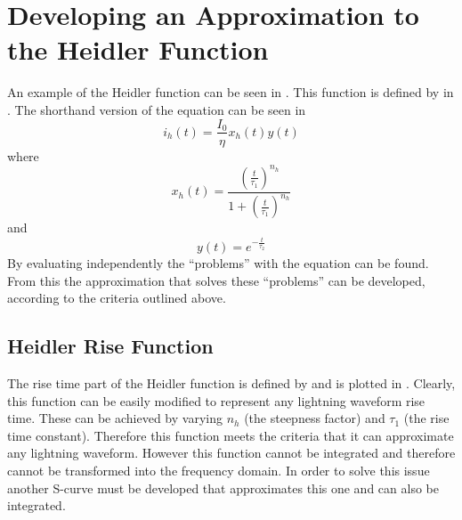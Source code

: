 \section{Developing an Approximation to the Heidler Function}
\label{sec:developing_approximation}
An example of the Heidler function can be seen in . This function is defined by  in .
The shorthand version of the equation can be seen in 
\begin{equation}
i_h \left( t \right) = \frac{I_0}{\eta} x_h \left( t \right) y \left( t \right)
\label{eqn:HFsmall}
\end{equation}
where
\begin{equation}
    x_h \left( t \right) = \frac{{\left (\frac{t}{\tau_1} \right )}^{n_h}}{1 + {\left (\frac{t}{\tau_1} \right )}^{n_h}}
    \label{eqn:HFrise}
\end{equation}
and
\begin{equation}
    y \left( t \right) = e^{-\frac{t}{\tau_2}}
    \label{eqn:HFfall}
\end{equation}
By evaluating  independently the ``problems'' with the equation can be found. From this the approximation that solves these ``problems'' can be developed, according to the criteria outlined above.

\subsection{Heidler Rise Function}
\label{sub:approx_heidler_rise_function}

The rise time part of the Heidler function is defined by  and is plotted in . Clearly, this function can be easily modified to represent any lightning waveform rise time. These can be achieved by varying $n_h$ (the steepness factor) and $\tau_1$ (the rise time constant). Therefore this function meets the criteria that it can approximate any lightning waveform. However this function cannot be integrated and therefore cannot be transformed into the frequency domain. In order to solve this issue another S-curve must be developed that approximates this one and can also be integrated.

